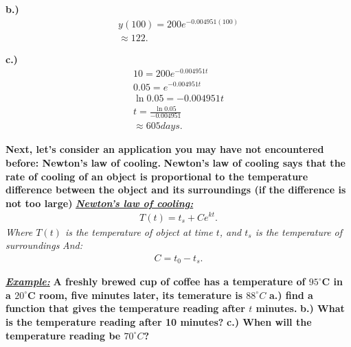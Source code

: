 \documentclass{report}
\begin{document}
    \bigbreak \noindent 
    \textbf{b.)}
    \begin{align*}
      y(100) = 200e^{-0.004951(100)} \\
      \approx 122
    .\end{align*}

    \bigbreak \noindent 
    \textbf{c.)}
    \begin{align*}
      10 = 200e^{-0.004951t} \\ 
      0.05 = e^{-0.004951t} \\
      \ln{0.05} = -0.004951t \\
      t = \frac{\ln{0.05}}{-0.004951} \\
      \approx 605 days
    .\end{align*}

    \bigbreak \noindent 
    \begin{mdframed}
      \textbf{Next, let's consider an application you may have not encountered before:
        Newton's law of cooling.
      }
      \smallbreak \noindent
      \textbf{Newton's law of cooling says that the rate of cooling of an object is proportional to the temperature 
      difference between the object and its surroundings (if the difference is not too large)}
      \bigbreak \noindent 
      \textbf{\textit{\underline{Newton's law of cooling:}}}
      \begin{align*}
        T(t) = t_s + Ce^{kt}
      .\end{align*}
      \bigbreak \noindent 
      \textit{Where $T(t)$ is the temperature of object at time  $t$, and $t_s$ is the temperature of surroundings}
      \smallbreak \noindent
      \textit{And:}
      \begin{align*}
        C = t_0 - t_s
      .\end{align*}
    \end{mdframed}

    \bigbreak \noindent 
    \begin{mdframed}
      \textbf{\textit{\underline{Example:}}} \textbf{A freshly brewed cup of coffee has a temperature of
      $95^{\circ}$C in a $20^{\circ}$C room, five minutes later, its temerature is $88^{\circ}C$
      }
      \bigbreak \noindent 
      \textbf{a.) find a function that gives the temperature reading after $t$ minutes.}
      \smallbreak \noindent
      \textbf{b.) What is the temperature reading after 10 minutes?}
      \smallbreak \noindent
      \textbf{c.) When will the temperature reading be $70^{\circ}C$?}
    \end{mdframed}
\end{document}
